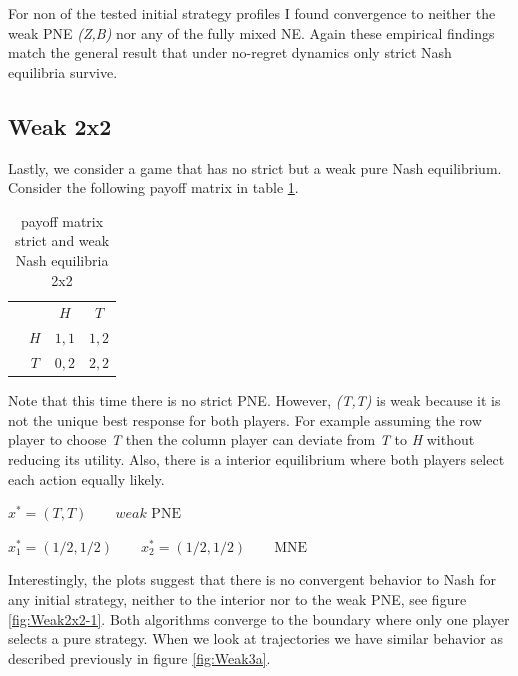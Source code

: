 For non of the tested initial strategy profiles I found convergence to neither the weak PNE \textit{(Z,B)} nor any of the fully mixed NE. Again these empirical findings match the general result that under no-regret dynamics only strict Nash equilibria survive.  

\subsection{Weak 2x2}\label{subsection:Weak 2x2}

Lastly, we consider a game that has no strict but a weak pure Nash equilibrium. Consider the following payoff matrix in table \ref{tab:payoffWeak2x2}. 

\begin{table}[H]\centering
\setlength{\extrarowheight}{2pt}
\begin{tabular}{cc|c|c|}
  & \multicolumn{1}{c}{} & \multicolumn{1}{c}{$H$}  & \multicolumn{1}{c}{$T$} \\\cline{3-4}
  & $H$ & $1,1$ & $1,2$ \\\cline{3-4}
  & $T$ & $0,2$ & $2,2$ \\\cline{3-4}
\end{tabular}\caption{\label{tab:payoffWeak2x2}payoff matrix strict and weak Nash equilibria 2x2}
\end{table}

Note that this time there is no strict PNE. However, \textit{(T,T)} is weak because it is not the unique best response for both players. For example assuming the row player to choose \textit{T} then the column player can deviate from \textit{T} to \textit{H} without reducing its utility. Also, there is a interior equilibrium where both players select each action equally likely. 

\begin{description}\centering
    \item $x^{*} = (T,T) \qquad \textit{weak }\text{PNE}$
    \item $x_{1}^* = (1/2,1/2) \qquad x_{2}^* = (1/2,1/2) \qquad \text{MNE}$
\end{description}

Interestingly, the plots suggest that there is no convergent behavior to Nash for any initial strategy, neither to the interior nor to the weak PNE, see figure \ref{fig:Weak2x2-1}. Both algorithms converge to the boundary where only one player selects a pure strategy. When we look at trajectories we have similar behavior as described previously in figure \ref{fig:Weak3a}. 

